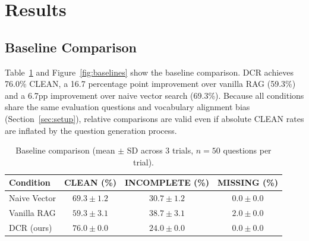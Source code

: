 \documentclass[11pt,a4paper]{article}
\begin{document}
\section{Results}
\label{sec:results}

\subsection{Baseline Comparison}

Table~\ref{tab:baselines} and Figure~\ref{fig:baselines} show the baseline comparison. DCR achieves 76.0\% CLEAN, a 16.7 percentage point improvement over vanilla RAG (59.3\%) and a 6.7pp improvement over naive vector search (69.3\%). Because all conditions share the same evaluation questions and vocabulary alignment bias (Section~\ref{sec:setup}), relative comparisons are valid even if absolute CLEAN rates are inflated by the question generation process.

\begin{table}[t]
\centering
\caption{Baseline comparison (mean $\pm$ SD across 3 trials, $n = 50$ questions per trial).}
\label{tab:baselines}
\begin{tabular}{@{}lccc@{}}
\toprule
Condition & CLEAN (\%) & INCOMPLETE (\%) & MISSING (\%) \\
\midrule
Naive Vector & $69.3 \pm 1.2$ & $30.7 \pm 1.2$ & $0.0 \pm 0.0$ \\
Vanilla RAG & $59.3 \pm 3.1$ & $38.7 \pm 3.1$ & $2.0 \pm 0.0$ \\
DCR (ours) & $\mathbf{76.0 \pm 0.0}$ & $24.0 \pm 0.0$ & $0.0 \pm 0.0$ \\
\bottomrule
\end{tabular}
\end{table}
\end{document}
